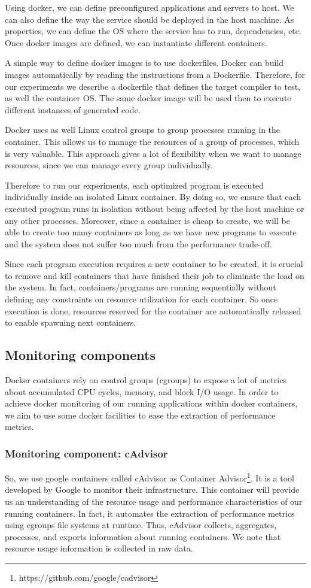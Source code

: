 Using docker, we can define preconfigured applications and servers to host. We can also define the way the service should be deployed in the host machine. As properties, we can define the OS where the service has to run, dependencies, etc. Once docker images are defined, we can instantiate different containers.

A simple way to define docker images is to use dockerfiles. Docker can build images automatically by reading the instructions from a Dockerfile. Therefore, for our experiments we describe a dockerfile that defines the target compiler to test, as well the container OS. The same docker image will be used then to execute different instances of generated code.

Docker uses as well Linux control groups to group processes running in the container. This allows us to manage the resources of a group of processes, which is very valuable. This approach gives a lot of flexibility when we want to manage resources, since we can manage every group individually. 

Therefore to run our experiments, each optimized program is executed individually inside an isolated Linux container. By doing so, we ensure that each executed program runs in isolation without being affected by the host machine or any other processes. Moreover, since a container is cheap to create, we will be able to create too many containers as long as we have new programs to execute and the system does not suffer too much from the performance trade-off.

Since each program execution requires a new container to be created, it is crucial to remove and kill containers that have finished their job to eliminate the load on the system. In fact, containers/programs are running sequentially without defining any constraints on resource utilization for each container. So once execution is done, resources reserved for the container are automatically released to enable spawning next containers.

\subsection{Monitoring components}
Docker containers rely on control groups (cgroups) to expose a lot of metrics about accumulated CPU cycles, memory, and block I/O usage. In order to achieve docker monitoring of our running applications within docker containers, we aim to use some docker facilities to ease the extraction of performance metrics.
\subsubsection{Monitoring component: cAdvisor}
So, we use google containers called cAdvisor as Container Advisor\footnote{https://github.com/google/cadvisor}. It is a tool developed by Google to monitor their infrastructure. This container will provide us an understanding of the resource usage and performance characteristics of our running containers. In fact, it automates the extraction of performance metrics using cgroups file systems at runtime. Thus, cAdvisor collects, aggregates, processes, and exports information about running containers. We note that resource usage information is collected in raw data.

